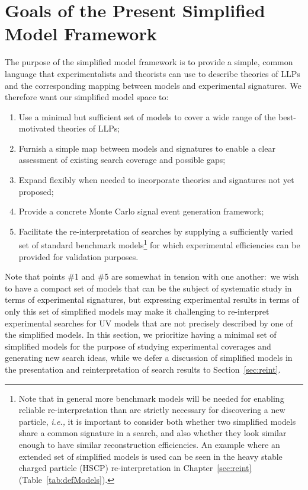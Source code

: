 \section{Goals of the Present Simplified Model Framework}\label{sec:goals}

The purpose of the simplified model framework is to provide a simple, common language that experimentalists and theorists can use to describe theories of LLPs and the corresponding mapping between models and experimental signatures. We therefore want our simplified model space to:
%
\begin{enumerate}
%
\item  Use a minimal but sufficient set of models to cover a wide range of the best-motivated theories of LLPs;
\item  Furnish a simple map between models and signatures to enable a clear assessment of existing search coverage and possible gaps; 
\item Expand flexibly when needed to incorporate theories and signatures not yet proposed;
\item Provide a concrete Monte Carlo signal event generation framework;
\item Facilitate the re-interpretation of searches by supplying a sufficiently varied set of standard benchmark models\footnote{Note that in general more benchmark models will be needed for enabling reliable re-interpretation than are strictly necessary for discovering a new particle, \emph{i.e.,}  it is important to consider both whether two simplified models share a common signature in a search, and also whether they look similar enough to have similar reconstruction efficiencies. An example where an extended set of simplified models is used can be seen in the heavy stable charged particle (HSCP) re-interpretation in Chapter~\ref{sec:reint} (Table~\ref{tab:defModels}). } for which experimental efficiencies can be provided for validation purposes.
\end{enumerate}
%
Note that points \#1 and \#5 are somewhat in tension with one another:~we wish to have a compact set of models that can be the subject of systematic study in terms of experimental signatures, but expressing experimental results in terms of only this set of simplified models may make it challenging to re-interpret experimental searches for UV models that are not precisely described by one of the simplified models. In this section, we prioritize having a minimal set of simplified models for the purpose of studying experimental coverages and generating new search ideas, while we defer a discussion of simplified models in the presentation and reinterpretation of search results to Section~\ref{sec:reint}.

